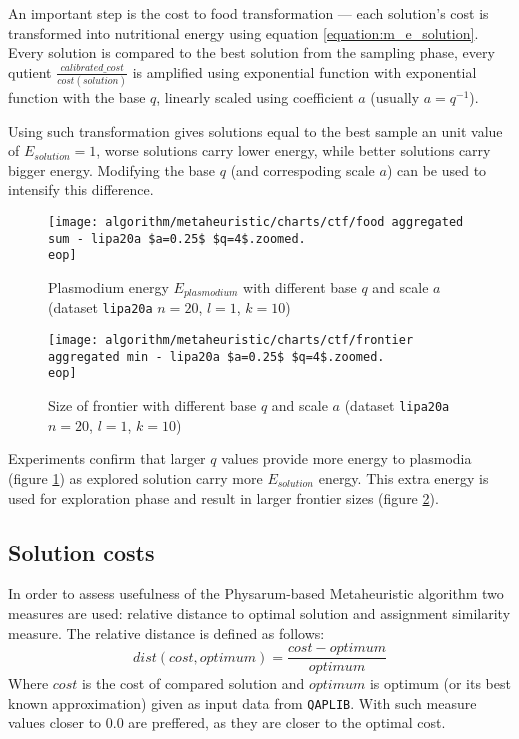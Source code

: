 An important step is the cost to food transformation --- each solution's cost is transformed into nutritional energy using equation \ref{equation:m_e_solution}. Every solution is compared to the best solution from the sampling phase, every qutient $\frac{calibrated\_cost}{cost(solution)}$ is amplified using exponential function with exponential function with the  base $q$, linearly scaled using coefficient $a$ (usually $a=q^{-1}$). 

Using such transformation gives solutions equal to the best sample an unit value of $E_{solution}=1$, worse solutions carry lower energy, while better solutions carry bigger energy. Modifying the base $q$ (and correspoding scale $a$) can be used to intensify this difference.

\begin{figure}
  \centering

  \texttt{[image: algorithm/metaheuristic/charts/ctf/food aggregated sum - lipa20a \$a=0.25\$ \$q=4\$.zoomed.\\eop]}
  
  \caption{Plasmodium energy $E_{plasmodium}$ with different base $q$ and scale $a$ (dataset \texttt{lipa20a} $n=20$, $l=1$, $k=10$)}
  \label{figure:am_ctf_food}
\end{figure}

\begin{figure}
  \centering

  \texttt{[image: algorithm/metaheuristic/charts/ctf/frontier aggregated min - lipa20a \$a=0.25\$ \$q=4\$.zoomed.\\eop]}
  
  \caption{Size of frontier with different base $q$ and scale $a$ (dataset \texttt{lipa20a} $n=20$, $l=1$, $k=10$)}
  \label{figure:am_ctf_frontier}
\end{figure}

Experiments confirm that larger $q$ values provide more energy to plasmodia (figure \ref{figure:am_ctf_food}) as explored solution carry more $E_{solution}$ energy. This extra energy is used for exploration phase and result in larger frontier sizes (figure \ref{figure:am_ctf_frontier}).


\subsection{Solution costs}

In order to assess usefulness of the Physarum-based Metaheuristic algorithm two measures are used: relative distance to optimal solution and assignment similarity measure. The relative distance is defined as follows:
\begin{equation}
  dist(cost, optimum) = \frac{cost - optimum}{optimum}
\end{equation}
Where $cost$ is the cost of compared solution and $optimum$ is optimum (or its best known approximation) given as input data from \texttt{QAPLIB}. With such measure values closer to $0.0$ are preffered, as they are closer to the optimal cost.

